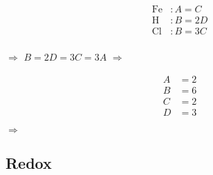 \begin{minipage}[l]{0.2\textwidth}
\begin{align*}
\text{Fe}&: A = C\\
\text{H}&: B = 2D\\
\text{Cl}&: B = 3C\\
\;
\end{align*}
\end{minipage}
$\Longrightarrow$
\hfil
$B=2D=3C=3A$
\hfil
$\Longrightarrow$
\begin{minipage}[l]{0.1\textwidth}
\begin{align*}
A&= 2\\
B&= 6\\
C&= 2\\
D&= 3
\end{align*}
\end{minipage}
$\Longrightarrow$
\hfil 
{}
\hfil


\subsection{Redox}

